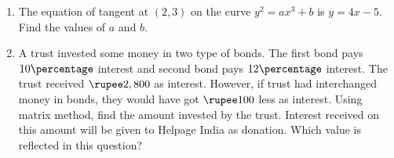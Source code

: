 \documentclass[12pt,-letter paper]{article}
\begin{document}
\begin{enumerate}
\item The equation of tangent at $(2,3)$ on the curve $y^2=ax^3+b$ is $y=4x-5$. Find the values of $a$ and $b$.            
\item A trust invested some money in two type of bonds. The first bond pays $10\percentage$ interest and second bond pays $12\percentage$ interest. The trust received  $\rupee2,800$ as interest. However, if trust had interchanged money in bonds, they would have got  $\rupee 100$ less as interest. Using matrix method, find the amount invested by the trust. Interest received on this amount will be given to Helpage India as donation. Which value is reflected in this question?
\end{enumerate}
\end{document}
